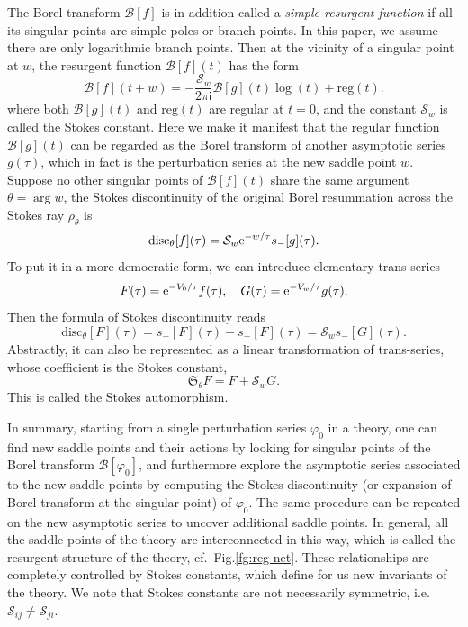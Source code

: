 \documentclass[a4paper,11pt]{article}	%
\def\mc{\mathcal}
\def\mf{\mathfrak}
\newcommand{\re}{{\rm e}}
\newcommand{\ri}{{\mathsf{i}}}
\begin{document}
The Borel transform $\mc{B}[f]$ is in addition called a \emph{simple
  resurgent function} if all its singular points are simple poles or
branch points.
%
In this paper, we assume there are only logarithmic branch points.
Then at the vicinity of a singular point at $w$, the resurgent
function $\mc{B}[f](t)$ has the form
\begin{equation}
  \mc{B}[f](t+w) = %
  -\frac{\mc{S}_w}{2\pi\ri} \mc{B}[g](t)\log(t) + \text{reg}(t).
\end{equation}
where both $\mc{B}[g](t)$ and $\text{reg}(t)$ are regular at $t=0$,
and the constant $\mc{S}_w$ is called the Stokes constant.  Here we
make it manifest that the regular function $\mc{B}[g](t)$ can be
regarded as the Borel transform of another asymptotic series
$g(\tau)$, which in fact is the perturbation series at the new saddle
point $w$.  Suppose no other singular points of $\mc{B}[f](t)$ share
the same argument $\theta = \arg w$, the Stokes discontinuity of the
original Borel resummation across the Stokes ray $\rho_\theta$ is
\begin{equation}
  \text{disc}_\theta[f](\tau) = \mc{S}_w\re^{-w/\tau} s_-[g](\tau).
  \label{eq:discStokes}
\end{equation}
To put it in a more democratic form, we can introduce elementary
trans-series
\begin{equation}
  F(\tau) = \re^{-V_0/\tau}f(\tau),\quad
  G(\tau) = \re^{-V_w/\tau}g(\tau).
\end{equation}
Then the formula of Stokes discontinuity reads
\begin{equation}
  \text{disc}_\theta[F](\tau) = s_+[F](\tau) - s_-[F](\tau)
  = \mc{S}_w s_-[G](\tau).
\end{equation}
Abstractly, it can also be represented as a linear transformation of
trans-series, whose coefficient is the Stokes constant,
\begin{equation}
  \mf{S}_\theta F = F+\mc{S}_w G.
\end{equation}
This is called the Stokes automorphism.

In summary, starting from a single perturbation series $\varphi_0$ in
a theory, one can find new saddle points and their actions by looking
for singular points of the Borel transform $\mc{B}[\varphi_0]$, and
furthermore explore the asymptotic series associated to the new saddle
points by computing the Stokes discontinuity (or expansion of Borel
transform at the singular point) of $\varphi_0$.  The same procedure
can be repeated on the new asymptotic series to uncover additional
saddle points. In general, all the saddle points of the theory are
interconnected in this way, which is called the resurgent structure of
the theory, cf.~Fig.\ref{fg:reg-net}. These relationships are
completely controlled by Stokes constants, which define for us new
invariants of the theory.
We note that Stokes constants are not necessarily symmetric,
i.e.~$\mc{S}_{ij}\neq \mc{S}_{ji}$.
\end{document}
